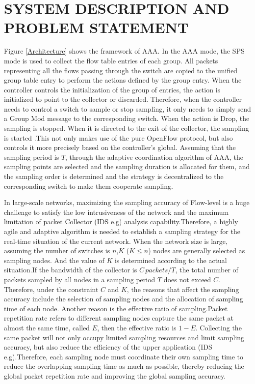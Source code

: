 \documentclass[conference]{IEEEtran}
\begin{document}
\section{SYSTEM DESCRIPTION AND PROBLEM STATEMENT }

Figure \ref{Architecture} shows the framework of AAA. In the AAA mode, the SPS mode is used to collect the flow table entries of each group. All packets representing all the flows passing through the switch are copied to the unified group table entry to perform the actions defined by the group entry. When the controller controls the initialization of the group of entries, the action is initialized to point to the collector or discarded. Therefore, when the controller needs to control a switch to sample or stop sampling, it only needs to simply send a Group Mod message to the corresponding switch. When the action is Drop, the sampling is stopped. When it is directed to the exit of the collector, the sampling is started .This not only makes use of the pure OpenFlow protocol, but also controls it more precisely based on the controller's global. Assuming that the sampling period is $T$, through the adaptive coordination algorithm of AAA, the sampling points are selected and the sampling duration is allocated for them, and the sampling order is determined and the strategy is decentralized to the corresponding switch to make them cooperate sampling.

In large-scale networks, maximizing the sampling accuracy of Flow-level is a huge challenge to satisfy the low intrusiveness of the network and the maximum limitation of packet Collector (IDS e.g) analysis capability.Therefore, a highly agile and adaptive algorithm is needed to establish a sampling strategy for the real-time situation of the current network. When the network size is large, assuming the number of switches is $n$,$K$ ($K \le n$) nodes are generally selected as sampling nodes. And the value of $K$ is determined according to the actual situation.If the bandwidth of the collector is $C\, packets/T$, the total number of packets sampled by all nodes in a sampling period $T$ does not exceed $C$. Therefore, under the constraint $C$ and $K$, the reasons that affect the sampling accuracy include the selection of sampling nodes and the allocation of sampling time of each node. Another reason is the effective ratio of sampling.Packet repetition rate refers to different sampling nodes capture the same packet at almost the same time, called $E$, then the effective ratio is $1-E$. Collecting the same packet will not only occupy limited sampling resources and limit sampling accuracy, but also reduce the efficiency of the upper application (IDS e.g).Therefore, each sampling node must coordinate their own sampling time to reduce the overlapping sampling time as much as possible, thereby reducing the global packet repetition rate and improving the global sampling accuracy.
\end{document}
